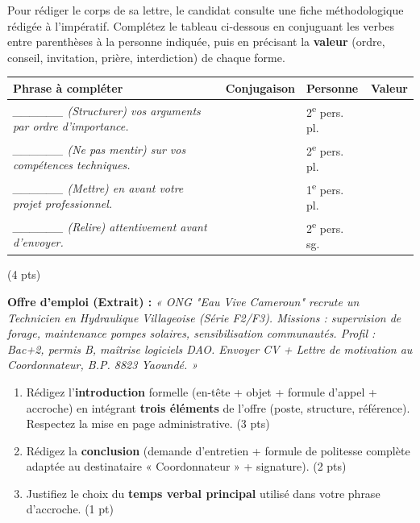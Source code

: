 \documentclass[11pt]{article}
\begin{document}
\begin{exercice}
Pour rédiger le corps de sa lettre, le candidat consulte une fiche méthodologique rédigée à l'impératif. Complétez le tableau ci-dessous en conjuguant les verbes entre parenthèses à la personne indiquée, puis en précisant la \textbf{valeur} (ordre, conseil, invitation, prière, interdiction) de chaque forme.

\begin{tabular}{|p{3.5cm}|p{3.5cm}|p{3.5cm}|p{3.5cm}|}
\hline
\textbf{Phrase à compléter} & \textbf{Conjugaison} & \textbf{Personne} & \textbf{Valeur} \\ \hline
\textit{\_\_\_\_\_\_ (Structurer) vos arguments par ordre d'importance.} & & 2\textsuperscript{e} pers. pl. & \\ \hline
\textit{\_\_\_\_\_\_ (Ne pas mentir) sur vos compétences techniques.} & & 2\textsuperscript{e} pers. pl. & \\ \hline
\textit{\_\_\_\_\_\_ (Mettre) en avant votre projet professionnel.} & & 1\textsuperscript{e} pers. pl. & \\ \hline
\textit{\_\_\_\_\_\_ (Relire) attentivement avant d'envoyer.} & & 2\textsuperscript{e} pers. sg. & \\ \hline
\end{tabular}
(4 pts)
\end{exercice}

\begin{exercice}
\textbf{Offre d'emploi (Extrait) :} \textit{« ONG "Eau Vive Cameroun" recrute un Technicien en Hydraulique Villageoise (Série F2/F3). Missions : supervision de forage, maintenance pompes solaires, sensibilisation communautés. Profil : Bac+2, permis B, maîtrise logiciels DAO. Envoyer CV + Lettre de motivation au Coordonnateur, B.P. 8823 Yaoundé. »}

\begin{enumerate}
    \item Rédigez l'\textbf{introduction} formelle (en-tête + objet + formule d'appel + accroche) en intégrant \textbf{trois éléments} de l'offre (poste, structure, référence). Respectez la mise en page administrative. (3 pts)
    \item Rédigez la \textbf{conclusion} (demande d'entretien + formule de politesse complète adaptée au destinataire « Coordonnateur » + signature). (2 pts)
    \item Justifiez le choix du \textbf{temps verbal principal} utilisé dans votre phrase d'accroche. (1 pt)
\end{enumerate}
\end{exercice}
\end{document}
